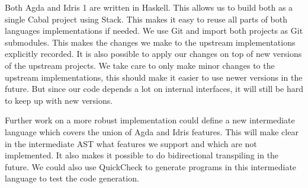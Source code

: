 %

Both Agda and Idris 1 are written in Haskell.  This allows us to build both as
a single Cabal project using Stack.  This makes it easy to reuse all parts of
both languages implementations if needed.  We use Git and import both projects
as Git submodules. This makes the changes we make to the upstream
implementations explicitly recorded. It is also possible to apply our changes
on top of new versions of the upstream projects.  We take care to only make
minor changes to the upstream implementations, this should make it easier to
use newer versions in the future.  But since our code depends a lot on internal
interfaces, it will still be hard to keep up with new versions.



Further work on a more robust implementation could define a new intermediate
language which covers the union of Agda and Idris features.
This will make clear in the intermediate AST what features we support and which
are not implemented.
It also makes it possible to do bidirectional transpiling in the future.
We could also use QuickCheck to generate programs in this intermediate language
to test the code generation.


